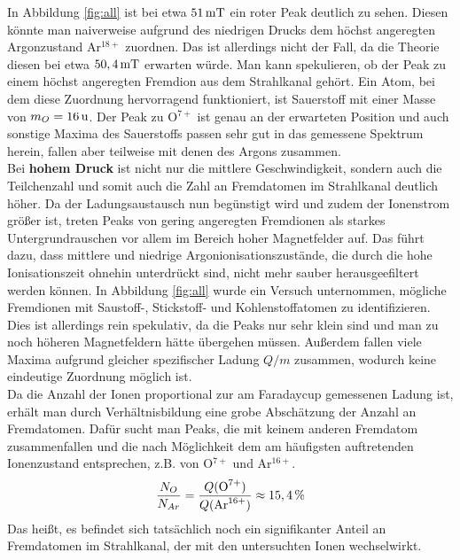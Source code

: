 		In Abbildung \ref{fig:all} ist bei etwa $\unit[51]{mT}$ ein roter Peak deutlich zu sehen. Diesen könnte man naiverweise aufgrund des niedrigen Drucks dem höchst angeregten Argonzustand Ar$^{18+}$ zuordnen. Das ist allerdings nicht der Fall, da die Theorie diesen bei etwa $\unit[50,4]{mT}$ erwarten würde. Man kann spekulieren, ob der Peak zu einem höchst angeregten Fremdion aus dem Strahlkanal gehört. Ein Atom, bei dem diese Zuordnung hervorragend funktioniert, ist Sauerstoff mit einer Masse von $m_O = \unit[16]{u}$. Der Peak zu O$^{7+}$ ist genau an der erwarteten Position und auch sonstige Maxima des Sauerstoffs passen sehr gut in das gemessene Spektrum herein, fallen aber teilweise mit denen des Argons zusammen.\\
		Bei \textbf{hohem Druck} ist nicht nur die mittlere Geschwindigkeit, sondern auch die Teilchenzahl und somit auch die Zahl an Fremdatomen im Strahlkanal deutlich höher. Da der Ladungsaustausch nun begünstigt wird und zudem der Ionenstrom größer ist, treten Peaks von gering angeregten Fremdionen als starkes Untergrundrauschen vor allem im Bereich hoher Magnetfelder auf. Das führt dazu, dass mittlere und niedrige Argonionisationszustände, die durch die hohe Ionisationszeit ohnehin unterdrückt sind, nicht mehr sauber herausgeefiltert werden können. In Abbildung \ref{fig:all} wurde ein Versuch unternommen, mögliche Fremdionen mit Saustoff-, Stickstoff- und Kohlenstoffatomen zu identifizieren. Dies ist allerdings rein spekulativ, da die Peaks nur sehr klein sind und man zu noch höheren Magnetfeldern hätte übergehen müssen. Außerdem fallen viele Maxima aufgrund gleicher spezifischer Ladung $Q/m$ zusammen, wodurch keine eindeutige Zuordnung möglich ist.\\
		Da die Anzahl der Ionen proportional zur am Faradaycup gemessenen Ladung ist, erhält man durch Verhältnisbildung eine grobe Abschätzung der Anzahl an Fremdatomen. Dafür sucht man Peaks, die mit keinem anderen Fremdatom zusammenfallen und die nach Möglichkeit dem am häufigsten auftretenden Ionenzustand entsprechen, z.B. von O$^{7+}$ und Ar$^{16+}$.
		\begin{equation}
			\frac{N_{O}}{N_{Ar}} = \frac{Q(\text{O}^{7+})}{Q(\text{Ar}^{16+})}\approx \unit[15,4]{\%}
		\end{equation}
		Das heißt, es befindet sich tatsächlich noch ein signifikanter Anteil an Fremdatomen im Strahlkanal, der mit den untersuchten Ionen wechselwirkt.
		

